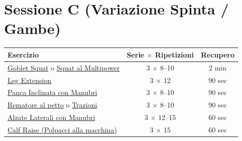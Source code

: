 \documentclass[11pt,a4paper]{article}
\begin{document}
\section*{Sessione C (Variazione Spinta / Gambe)}
\begin{tabular}{>{\raggedright\arraybackslash}p{6.5cm} c c}
\toprule
\textbf{Esercizio} & \textbf{Serie $\times$ Ripetizioni} & \textbf{Recupero} \\
\midrule
\href{https://www.youtube.com/results?search_query=goblet+squat+tutorial+short}{Goblet Squat} o \href{https://www.youtube.com/results?search_query=multipower+squat+tutorial+short}{Squat al Multipower} & 3 $\times$ 8--10 & 2 min \\
\href{https://www.youtube.com/results?search_query=leg+extension+tutorial+short}{Leg Extension} & 3 $\times$ 12 & 90 sec \\
\href{https://www.youtube.com/results?search_query=incline+dumbbell+press+tutorial+short}{Panca Inclinata con Manubri} & 3 $\times$ 8--10 & 90 sec \\
\href{https://www.youtube.com/results?search_query=chest+supported+row+tutorial+short}{Rematore al petto} o \href{https://www.youtube.com/results?search_query=pull+up+tutorial+short}{Trazioni} & 3 $\times$ 8--10 & 90 sec \\
\href{https://www.youtube.com/results?search_query=dumbbell+lateral+raise+tutorial+short}{Alzate Laterali con Manubri} & 3 $\times$ 12--15 & 60 sec \\
\href{https://www.youtube.com/results?search_query=standing+calf+raise+tutorial+short}{Calf Raise (Polpacci alla macchina)} & 3 $\times$ 15 & 60 sec \\
\bottomrule
\end{tabular}
\end{document}
